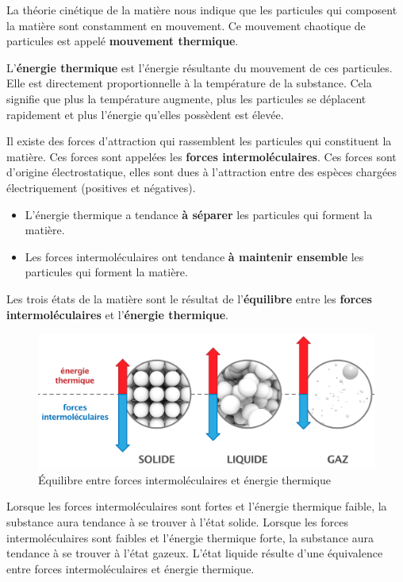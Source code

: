\documentclass[
  11pt,
  a4paper,
  openany]{book}
\providecommand{\tightlist}{%
  \setlength{\itemsep}{0pt}\setlength{\parskip}{0pt}}
\begin{document}
La théorie cinétique de la matière nous indique que les particules qui composent la matière sont constamment en mouvement. Ce mouvement chaotique de particules est appelé \textbf{mouvement thermique}.

L'\textbf{énergie thermique} est l'énergie résultante du mouvement de ces particules. Elle est directement proportionnelle à la température de la substance. Cela signifie que plus la température augmente, plus les particules se déplacent rapidement et plus l'énergie qu'elles possèdent est élevée.

Il existe des forces d'attraction qui rassemblent les particules qui constituent la matière. Ces forces sont appelées les \textbf{forces intermoléculaires}. Ces forces sont d'origine électrostatique, elles sont dues à l'attraction entre des espèces chargées électriquement (positives et négatives).

\begin{itemize}
\tightlist
\item
  L'énergie thermique a tendance \textbf{à séparer} les particules qui forment la matière.
\item
  Les forces intermoléculaires ont tendance \textbf{à maintenir ensemble} les particules qui forment la matière.
\end{itemize}

Les trois états de la matière sont le résultat de l'\textbf{équilibre} entre les \textbf{forces intermoléculaires} et l'\textbf{énergie thermique}.

\begin{figure}

{\centering \includegraphics[width=0.67\linewidth]{images/mvt-thermique} 

}

\caption{Équilibre entre forces intermoléculaires et énergie thermique}\label{fig:mvt-thermique}
\end{figure}

Lorsque les forces intermoléculaires sont fortes et l'énergie thermique faible, la substance aura tendance à se trouver à l'état solide. Lorsque les forces intermoléculaires sont faibles et l'énergie thermique forte, la substance aura tendance à se trouver à l'état gazeux. L'état liquide résulte d'une équivalence entre forces intermoléculaires et énergie thermique.
\end{document}
